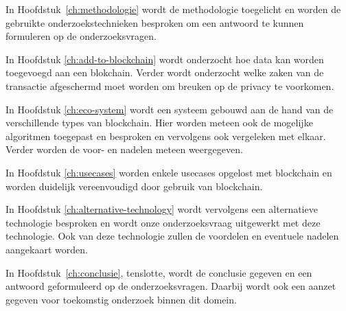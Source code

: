 In Hoofdstuk~\ref{ch:methodologie} wordt de methodologie toegelicht en worden de gebruikte onderzoekstechnieken besproken om een antwoord te kunnen formuleren op de onderzoeksvragen.

In Hoofdstuk \ref{ch:add-to-blockchain} wordt onderzocht hoe data kan worden toegevoegd aan een blokchain. Verder wordt onderzocht welke zaken van de transactie afgeschermd moet worden om breuken op de privacy te voorkomen. 

In Hoofdstuk \ref{ch:eco-system} wordt een systeem gebouwd aan de hand van de verschillende types van blockchain. Hier worden meteen ook de mogelijke algoritmen toegepast en besproken  en vervolgens ook vergeleken met elkaar. Verder worden de voor- en nadelen meteen weergegeven. 

In Hoofdstuk \ref{ch:usecases} worden enkele usecases opgelost met blockchain en worden duidelijk vereenvoudigd door gebruik van blockchain. 

In Hoofdstuk \ref{ch:alternative-technology} wordt vervolgens een alternatieve technologie besproken en wordt onze onderzoeksvraag uitgewerkt met deze technologie. Ook van deze technologie zullen de voordelen en eventuele nadelen aangekaart worden. 

In Hoofdstuk~\ref{ch:conclusie}, tenslotte, wordt de conclusie gegeven en een antwoord geformuleerd op de onderzoeksvragen. Daarbij wordt ook een aanzet gegeven voor toekomstig onderzoek binnen dit domein.

